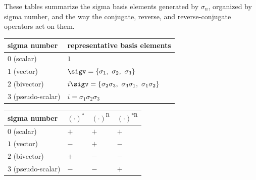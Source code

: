 \noindent These tables summarize the sigma basis elements generated by \(\sigma_n\), organized by sigma number, and the way the conjugate, reverse, and reverse-conjugate operators act on them.
\begin{tableblock}
\captionsetup{type=table,font=normalsize,labelfont=bf,skip=4pt}
\label{tab:sigma-grade-components-app}
\renewcommand{\arraystretch}{1.18}
\setlength{\tabcolsep}{4pt}
\normalsize
\begin{tabularx}{\columnwidth}{@{}l >{\raggedright\arraybackslash}X@{}}
\toprule
sigma number & representative basis elements \\
\midrule
\(0\) (scalar) & \(1\) \\
\(1\) (vector) & \(\sigv=\{\sigma_1,\ \sigma_2,\ \sigma_3\}\) \\
\(2\) (bivector) & \(i\sigv=\{\sigma_2\sigma_3,\ \sigma_3\sigma_1,\ \sigma_1\sigma_2\}\) \\
\(3\) (pseudo-scalar) & \(i=\sigma_1\sigma_2\sigma_3\) \\
\bottomrule
\end{tabularx}
\end{tableblock}

\begin{tableblock}
\captionsetup{type=table,font=normalsize,labelfont=bf,skip=4pt}
\label{tab:grade-signs}
\renewcommand{\arraystretch}{1.18}
\setlength{\tabcolsep}{4pt}
\normalsize
\begin{tabularx}{\columnwidth}{@{}l >{\raggedright\arraybackslash}X >{\raggedright\arraybackslash}X >{\raggedright\arraybackslash}X@{}}
\toprule
sigma number & \((\cdot)^*\) & \((\cdot)^{\mathrm R}\) & \((\cdot)^{*\mathrm R}\) \\
\midrule
\(0\) (scalar) & \(+\) & \(+\) & \(+\) \\
\(1\) (vector) & \(-\) & \(+\) & \(-\) \\
\(2\) (bivector) & \(+\) & \(-\) & \(-\) \\
\(3\) (pseudo-scalar) & \(-\) & \(-\) & \(+\) \\
\bottomrule
\end{tabularx}
\end{tableblock}
